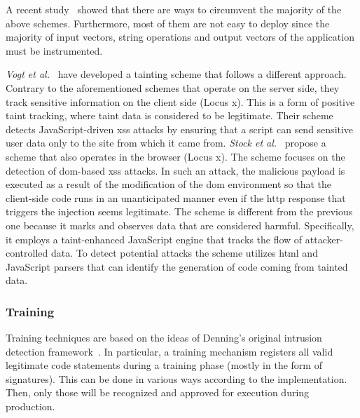 \documentclass[conference]{IEEEtran}
\begin{document}
A recent study~\cite{NBR14} showed that there are ways to circumvent
the majority of the above schemes. Furthermore, most of them are not
easy to deploy since the majority of input vectors, string operations
and output vectors of the application must be instrumented.

{\it Vogt et al.}~\cite{VFJKKV07} have developed a tainting scheme
that follows a different approach. Contrary to the aforementioned
schemes that operate on the server side, they track sensitive
information on the client side (Locus {\sc x}). This is a form of
positive taint tracking, where taint data is considered to be
legitimate. Their scheme detects JavaScript-driven {\sc xss} attacks
by ensuring that a script can send sensitive user data only to the
site from which it came from.
{\it Stock et al.}~\cite{SLMS14} propose a scheme that also operates
in the browser (Locus {\sc x}). The scheme focuses on the detection of
{\sc dom}-based {\sc xss} attacks. In such an attack, the malicious
payload is executed as a result of the modification of the {\sc dom}
environment so that the client-side code runs in an unanticipated
manner even if the {\sc http} response that triggers the injection
seems legitimate. The scheme is different from the previous one
because it marks and observes data that are considered harmful.
Specifically, it employs a taint-enhanced JavaScript engine that
tracks the flow of attacker-controlled data. To detect potential
attacks the scheme utilizes {\sc html} and JavaScript parsers that can
identify the generation of code coming from tainted data.


\subsubsection{Training}

Training techniques are based on the ideas of Denning's original
intrusion detection framework~\cite{Den87}. In particular, a training
mechanism registers all valid legitimate code statements during a
training phase (mostly in the form of signatures). This can
be done in various ways according to the implementation. Then, only
those will be recognized and approved for execution
during production.
\end{document}

